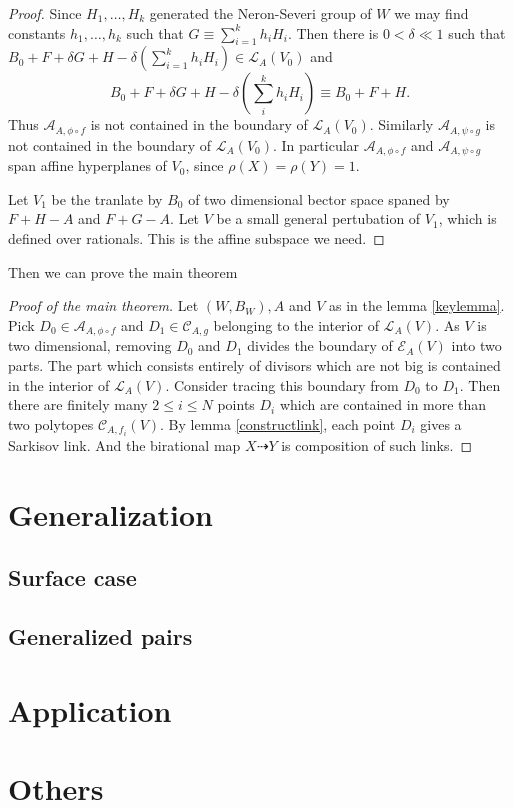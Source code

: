 \documentclass{article}
\begin{document}
\begin{proof}
Since $H_{1},\ldots ,H_{k}$ generated the Neron-Severi group of $W$ we may find constants $h_{1},\ldots ,h_{k}$ such that $G \equiv \sum^{k}_{i=1} h_{i}H_{i}$. Then there is $0< \delta\ll 1$ such that  $B_{0}+F+\delta G+H- \delta(\sum_{i=1}^{k} h_{i}H_{i}) \in \mathcal{L}_{A}(V_{0})$ and
\[
  B_{0}+F+\delta G+H-\delta (\sum_i^k h_{i}H_{i}) \equiv B_{0}+F+H
.\]
Thus $\mathcal{A}_{A,\phi\circ f}$ is not contained in the boundary of $\mathcal{L}_{A}(V_{0})$. Similarly $\mathcal{A}_{A,\psi\circ g}$ is not contained in the boundary of $\mathcal{L}_{A}(V_{0})$. In particular $\mathcal{A}_{A,\phi\circ f}$ and   $\mathcal{A}_{A,\psi\circ g}$ span affine hyperplanes of $V_{0}$, since $\rho(X)=\rho(Y)=1$.

Let $V_{1}$ be the tranlate by $B_{0}$ of two dimensional bector space spaned by $F+H-A$ and $F+G-A$. Let $V$ be a small general pertubation of $V_{1}$, which is defined over rationals. This is the affine subspace we need.
\end{proof}
Then we can prove the main theorem
\begin{proof}[Proof of the main theorem]
Let $(W,B_{W}),A $ and $V$ as in the lemma \ref{keylemma}.  Pick $ D_{0} \in \mathcal{A}_{A,\phi\circ f} $  and $ D_1\in \mathcal{C}_{A,g} $ belonging to the interior of $ \mathcal{L}_A(V) $. As $ V $ is two dimensional, removing $ D_0 $ and $ D_1 $ divides the boundary of $ \mathcal{E}_A(V) $ into two parts. The part which consists entirely of divisors which are not big is contained in the interior of $ \mathcal{L}_A(V) $. Consider tracing this boundary from $ D_0 $ to $ D_1 $. Then there are finitely many $ 2\leqslant i\leqslant N $ points $ D_i $ which are contained in more than two polytopes $ \mathcal{C}_{A,f_i}(V) $. By lemma \ref{constructlink},  each point $ D_i $ gives a Sarkisov link. And the birational map $X \dashrightarrow Y$ is composition of such links.
\end{proof}

\section{Generalization}
\subsection{Surface case}
\subsection{Generalized pairs}

\section{Application}

\section{Others}
\end{document}
